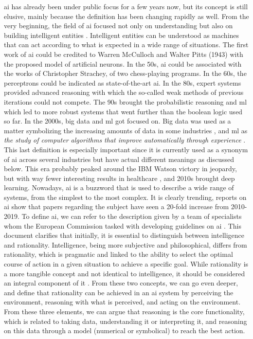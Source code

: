 
\ac{ai} has already been under public focus for a few years now, but its concept is still elusive, mainly because the definition has been changing rapidly as well.
From the very beginning, the field of \ac{ai} focused not only on understanding but also on building intelligent entities \cite{DBLP:books/aw/RN2020}. Intelligent entities can be understood as machines that can act according to what is expected in a wide range of situations.
The first work of \ac{ai} could be credited to Warren McCulloch and Walter Pitts (1943) with the proposed model of artificial neurons. In the 50s, \ac{ai} could be associated with the works of Christopher Strachey, of two chess-playing programs.
In the 60s, the perceptrons could be indicated as state-of-the-art \ac{ai}. In the 80s, expert systems provided advanced reasoning with which the so-called weak methods of previous iterations could not compete.
The 90s brought the probabilistic reasoning and \ac{ml} which led to more robust systems that went further than the boolean logic used so far. In the 2000s, big data and \ac{ml} got focused on. Big data was used as a matter symbolizing the increasing amounts of data in some industries \cite{dashBigDataHealthcare2019}, and \ac{ml} as \textit{ the study of computer algorithms that improve automatically through experience} \cite{mitchell1997machine}. This last definition is especially important since it is currently used as a synonym of \ac{ai} across several industries but have actual different meanings as discussed below. This era probably peaked around the IBM Watson victory in jeopardy, but with way fewer interesting results in healthcare \cite{swetlitzIBMWatsonSupercomputer2018}, and 2010s brought deep learning. 
Nowadays, \ac{ai} is a buzzword that is used to describe a wide range of systems, from the simplest to the most complex. It is clearly trending, reports on \ac{ai} show that papers regarding the subject have seen a 20-fold increase from 2010-2019.
To define \ac{ai}, we can refer to the description given by a team of specialists whom the European Commission tasked with developing guidelines on \ac{ai} \cite{DefinitionAIMain2019}. This document clarifies that initially, it is essential to distinguish between intelligence and rationality. Intelligence, being more subjective and philosophical, differs from rationality, which is pragmatic and linked to the ability to select the optimal course of action in a given situation to achieve a specific goal. While rationality is a more tangible concept and not identical to intelligence, it should be considered an integral component of it \cite{DefinitionAIMain2019,DBLP:books/aw/RN2020}.
From these two concepts, we can go even deeper, and define that rationality can be achieved in an \ac{ai} system by perceiving the environment, reasoning with what is perceived, and acting on the environment. From these three elements, we can argue that reasoning is the core functionality, which is related to taking data, understanding it or interpreting it, and reasoning on this data through a model (numerical or symbolical) to reach the best action.

